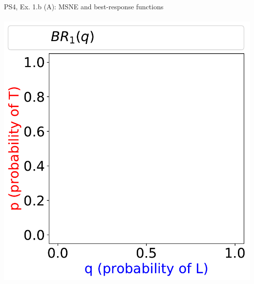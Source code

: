 \begin{frame}{PS4, Ex. 1.b (A): MSNE and best-response functions}
\begin{multicols}{2}
\begin{align*}
    \end{align*}
    \vspace{-8pt}
    \includegraphics[width=\columnwidth]{figures/empty_plot_}
  \vfill\null
  \end{multicols}
\end{frame}
